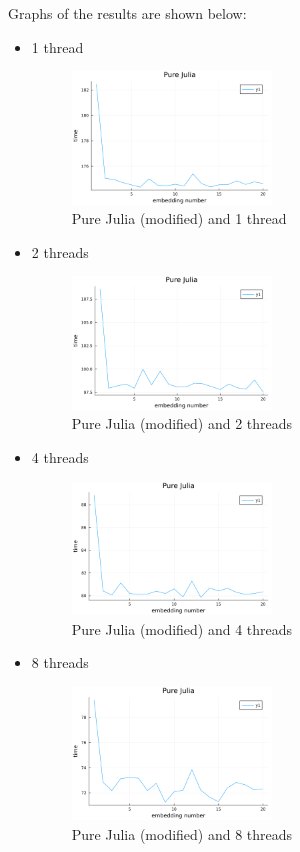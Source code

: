 Graphs of the results are shown below:
\begin{itemize}
    \item 1 thread
    \begin{figure}[H]
        \includegraphics[width=0.5\textwidth]{media/bhembed1.png}
        \caption{Pure Julia (modified) and 1 thread}
    \end{figure}
    \item 2 threads
    \begin{figure}[H]
        \includegraphics[width=0.5\textwidth]{media/bhembed2.png}
        \caption{Pure Julia (modified) and 2 threads}
    \end{figure}
    \item 4 threads
    \begin{figure}[H]
        \includegraphics[width=0.5\textwidth]{media/bhembed4.png}
        \caption{Pure Julia (modified) and 4 threads}
    \end{figure}
    \item 8 threads
    \begin{figure}[H]
        \includegraphics[width=0.5\textwidth]{media/bhembed8.png}
        \caption{Pure Julia (modified) and 8 threads}
    \end{figure}
\end{itemize}